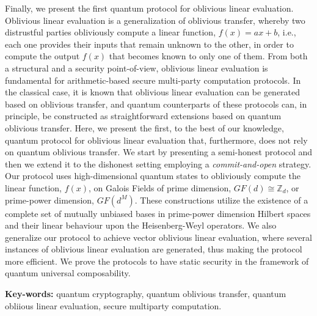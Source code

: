 Finally, we present the first quantum protocol for oblivious linear evaluation. Oblivious linear evaluation is a generalization of oblivious transfer, whereby two distrustful parties obliviously compute a linear function, $f(x) = ax + b$, i.e., each one provides their inputs that remain  unknown to the other, in order to compute the output $f(x)$ that becomes known to only one of them. From both a structural and a security point-of-view, oblivious linear evaluation is fundamental for arithmetic-based secure multi-party computation protocols. In the classical case, it is known that oblivious linear evaluation can be generated based on oblivious transfer, and quantum counterparts of these protocols can, in principle, be constructed as straightforward extensions based on quantum oblivious transfer. Here, we present the first, to the best of our knowledge, quantum protocol for oblivious linear evaluation that, furthermore, does not rely on quantum oblivious transfer. We start by presenting a semi-honest protocol and then we extend it to the dishonest setting employing a \textit{commit-and-open} strategy. Our protocol uses high-dimensional quantum states to obliviously compute the linear function,  $f(x)$, on Galois Fields of prime dimension, $GF(d) \cong \mathbb{Z}_d$, or prime-power dimension, $GF(d^M)$. These constructions utilize the existence of a complete set of mutually unbiased bases in prime-power dimension Hilbert spaces and their linear behaviour upon the Heisenberg-Weyl operators.  We also generalize our protocol to achieve vector oblivious linear evaluation, where several instances of oblivious linear evaluation are generated, thus making the protocol more efficient. We prove the protocols to have static security in the framework of quantum universal composability.

\vfill

\begin{flushleft}
\textbf{Key-words:} quantum cryptography, quantum oblivious transfer, quantum obliious linear evaluation, secure multiparty computation.
\end{flushleft}
